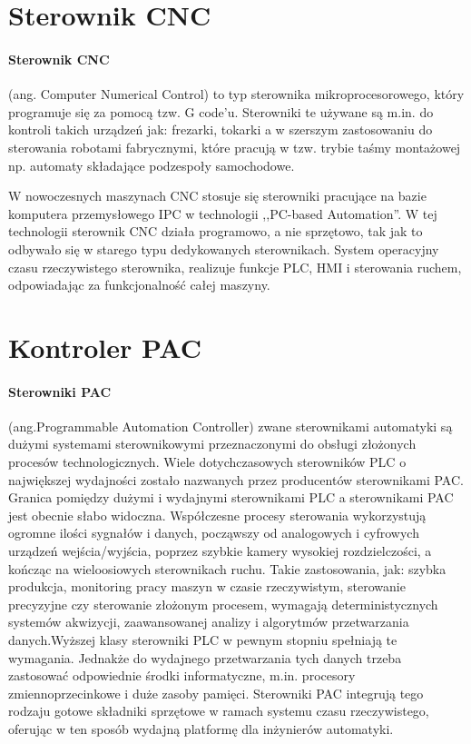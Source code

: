 \documentclass[a4paper,twoside]{report}
\begin{document}
\section{Sterownik CNC}
\paragraph{Sterownik CNC} (ang. Computer Numerical Control) to typ sterownika mikroprocesorowego, który programuje się za pomocą tzw. G code'u. Sterowniki te używane są m.in. do kontroli takich urządzeń jak: frezarki, tokarki a w szerszym zastosowaniu do sterowania robotami fabrycznymi, które pracują w tzw. trybie taśmy montażowej np. automaty składające podzespoły samochodowe.

W nowoczesnych maszynach CNC stosuje się sterowniki pracujące na bazie komputera przemysłowego IPC w technologii ,,PC-based Automation''. W tej technologii sterownik CNC działa programowo, a nie sprzętowo, tak jak to odbywało się w starego typu dedykowanych sterownikach. System operacyjny czasu rzeczywistego sterownika, realizuje funkcje PLC, HMI i sterowania ruchem, odpowiadając za funkcjonalność całej maszyny.

\section{Kontroler PAC}
\paragraph{Sterowniki PAC} (ang.Programmable Automation Controller) zwane sterownikami automatyki są dużymi systemami sterownikowymi przeznaczonymi do obsługi złożonych procesów technologicznych. Wiele dotychczasowych sterowników PLC o największej wydajności zostało nazwanych przez producentów sterownikami PAC. Granica pomiędzy dużymi i wydajnymi sterownikami PLC a sterownikami PAC jest obecnie słabo widoczna.
Współczesne procesy sterowania wykorzystują ogromne ilości sygnałów i danych, począwszy od analogowych i cyfrowych urządzeń wejścia/wyjścia, poprzez szybkie kamery wysokiej rozdzielczości, a kończąc na wieloosiowych
sterownikach ruchu. Takie zastosowania, jak: szybka produkcja, monitoring pracy maszyn w czasie rzeczywistym, sterowanie precyzyjne czy sterowanie złożonym procesem, wymagają deterministycznych systemów akwizycji, zaawansowanej analizy i algorytmów przetwarzania danych.Wyższej klasy sterowniki PLC w pewnym stopniu spełniają te wymagania. Jednakże do wydajnego przetwarzania tych danych trzeba zastosować odpowiednie środki informatyczne, m.in. procesory zmiennoprzecinkowe i duże zasoby pamięci. Sterowniki PAC integrują tego rodzaju gotowe składniki sprzętowe w ramach systemu czasu rzeczywistego, oferując w ten sposób wydajną platformę dla inżynierów automatyki.
\end{document}

